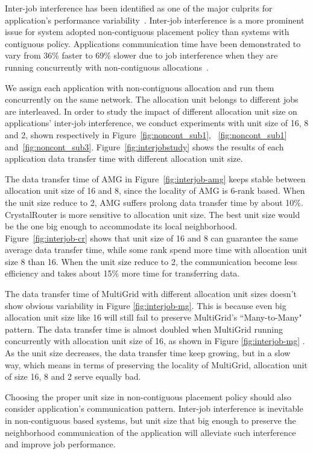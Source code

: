 Inter-job interference has been identified as one of the major culprits 
for application's performance variability~\cite{abhinav-sc13,skinner,rosenthal}. 
Inter-job interference is a more prominent issue for system adopted 
non-contiguous placement policy than systems with contiguous policy. 
Applications communication time have been demonstrated to 
vary from 36\% faster to 69\% slower due to job interference 
when they are running concurrently with non-contiguous allocations~\cite{abhinav-sc13}.

We assign each application with non-contiguous allocation and 
run them concurrently on the same network. 
The allocation unit belongs to different jobs are interleaved. 
In order to study the impact of different allocation unit size on 
applications' inter-job interference, 
we conduct experiments with unit size of 16, 8 and 2, 
shown respectively in Figure~\ref{fig:noncont_sub1}, 
~\ref{fig:noncont_sub1} and~\ref{fig:noncont_sub3}. 
Figure~\ref{fig:interjobstudy} shows the results of each application 
data transfer time with different allocation unit size. 

The data transfer time of AMG in Figure~\ref{fig:interjob-amg} keeps stable 
between allocation unit size of 16 and 8, since the locality of AMG is 6-rank based. 
When the unit size reduce to 2, AMG suffers prolong data transfer time by about 10\%. 
CrystalRouter is more sensitive to allocation unit size. 
The best unit size would be the one big enough to accommodate its local neighborhood. 
Figure~\ref{fig:interjob-cr} shows that unit size of 16 and 8 can guarantee 
the same average data transfer time, 
while some rank spend more time with allocation unit size 8 than 16. 
When the unit size reduce to 2, the communication become less efficiency 
and takes about 15\% more time for transferring data. 

The data transfer time of MultiGrid with different allocation unit sizes doesn't show obvious variability in Figure \ref{fig:interjob-mg}. This is because even big allocation unit size like 16 will still fail to preserve MultiGrid's ``Many-to-Many" pattern. The data transfer time is almost doubled when MultiGrid running concurrently with allocation unit size of 16, as shown in Figure \ref{fig:interjob-mg} . As the unit size decreases, the data transfer time keep growing, but in a slow way, which means in terms of preserving the locality of MultiGrid, allocation unit of size 16, 8 and 2 serve equally bad.

Choosing the proper unit size in non-contiguous placement policy should 
also consider application's communication pattern. 
Inter-job interference is inevitable in non-contiguous based systems, 
but unit size that big enough to preserve the neighborhood communication of the application 
will alleviate such interference and improve job performance. 




